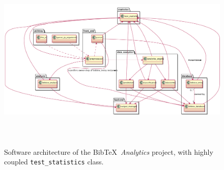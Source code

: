 \begin{figure}[h]
\centering 
\includegraphics[height=3.5in]{pics/sw-arch-higher-coupling/sw-arch}
\caption{Software architecture of the {\sc Bib}\TeX\ {\it Analytics} project, with highly coupled {\tt test\_statistics} class.}
\label{fig:SoftwareArchitectureWithHigherCoupling}
\end{figure}










































